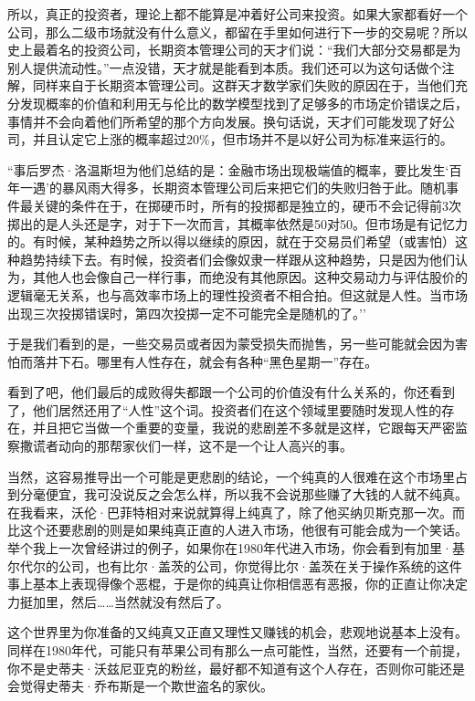 所以，真正的投资者，理论上都不能算是冲着好公司来投资。如果大家都看好一个公司，那么二级市场就没有什么意义，都留在手里如何进行下一步的交易呢？所以史上最着名的投资公司，长期资本管理公司的天才们说：``我们大部分交易都是为别人提供流动性。''一点没错，天才就是能看到本质。我们还可以为这句话做个注解，同样来自于长期资本管理公司。这群天才数学家们失败的原因在于，当他们充分发现概率的价值和利用无与伦比的数学模型找到了足够多的市场定价错误之后，事情并不会向着他们所希望的那个方向发展。换句话说，天才们可能发现了好公司，并且认定它上涨的概率超过20\%，但市场并不是以好公司为标准来运行的。

``事后罗杰·洛温斯坦为他们总结的是：金融市场出现极端值的概率，要比发生`百年一遇'的暴风雨大得多，长期资本管理公司后来把它们的失败归咎于此。随机事件最关键的条件在于，在掷硬币时，所有的投掷都是独立的，硬币不会记得前3次掷出的是人头还是字，对于下一次而言，其概率依然是50对50。但市场是有记忆力的。有时候，某种趋势之所以得以继续的原因，就在于交易员们希望（或害怕）这种趋势持续下去。有时候，投资者们会像奴隶一样跟从这种趋势，只是因为他们认为，其他人也会像自己一样行事，而绝没有其他原因。这种交易动力与评估股价的逻辑毫无关系，也与高效率市场上的理性投资者不相合拍。但这就是人性。当市场出现三次投掷错误时，第四次投掷一定不可能完全是随机的了。''

于是我们看到的是，一些交易员或者因为蒙受损失而抛售，另一些可能就会因为害怕而落井下石。哪里有人性存在，就会有各种``黑色星期一''存在。

看到了吧，他们最后的成败得失都跟一个公司的价值没有什么关系的，你还看到了，他们居然还用了``人性''这个词。投资者们在这个领域里要随时发现人性的存在，并且把它当做一个重要的变量，我说的悲剧差不多就是这样，它跟每天严密监察撒谎者动向的那帮家伙们一样，这不是一个让人高兴的事。

当然，这容易推导出一个可能是更悲剧的结论，一个纯真的人很难在这个市场里占到分毫便宜，我可没说反之会怎么样，所以我不会说那些赚了大钱的人就不纯真。在我看来，沃伦·巴菲特相对来说就算得上纯真了，除了他买纳贝斯克那一次。而比这个还要悲剧的则是如果纯真正直的人进入市场，他很有可能会成为一个笑话。举个我上一次曾经讲过的例子，如果你在1980年代进入市场，你会看到有加里·基尔代尔的公司，也有比尔·盖茨的公司，你觉得比尔·盖茨在关于操作系统的这件事上基本上表现得像个恶棍，于是你的纯真让你相信恶有恶报，你的正直让你决定力挺加里，然后\ldots\ldots 当然就没有然后了。

这个世界里为你准备的又纯真又正直又理性又赚钱的机会，悲观地说基本上没有。同样在1980年代，可能只有苹果公司有那么一点可能性，当然，还要有一个前提，你不是史蒂夫·沃兹尼亚克的粉丝，最好都不知道有这个人存在，否则你可能还是会觉得史蒂夫·乔布斯是一个欺世盗名的家伙。


